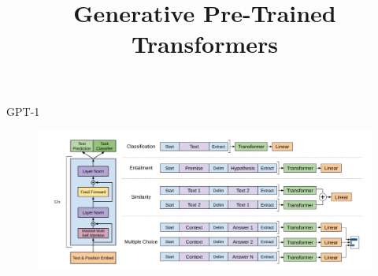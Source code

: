



\newcommand{\titlefigure}{figure/71-gpt_sq.png}
\newcommand{\learninggoals}{
\item use of the transformer decoder
\item input modifications (and how this is useful)}

\title{Generative Pre-Trained Transformers}
\date{}




\begin{vbframe}{GPT-1}

\vfill

	\begin{figure}
		\centering
		\includegraphics[width = 12cm]{figure/71-gpt}\\
	\end{figure}

\vfill

\end{vbframe}


